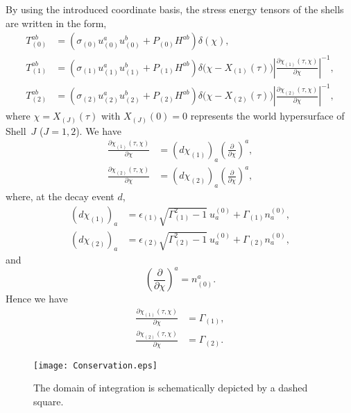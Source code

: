 \documentclass[aps,preprint,preprintnumber,nofootinbib,amsmath,amssymb,ascmac,bm,12pt]{revtex4}
\newcommand{\sz}{\sigma_{(0)}}
\newcommand{\so}{\sigma_{(1)}}
\newcommand{\st}{\sigma_{(2)}}
\newcommand{\Go}{\varGamma_{(1)}}
\newcommand{\Gt}{\varGamma_{(2)}}
\begin{document}
By using the introduced coordinate basis, the stress energy tensors of the shells are written in the form, 
\begin{align}
T_{(0)}^{ab}&=\left(\sz u_{(0)}^a u_{(0)}^b+P_{(0)}H^{ab}\right) \delta(\chi), \label{SE-0}\\
T_{(1)}^{ab}&=\left(\so u_{(1)}^a u_{(1)}^b+P_{(1)}H^{ab}\right) \delta\bigl(\chi-X_{(1)}(\tau)\bigr) 
\left|\frac{\partial \chi_{(1)}\left(\tau,\chi\right)}{\partial \chi}\right|^{-1}, \label{SE-1}\\
T_{(2)}^{ab}&=\left(\st u_{(2)}^a u_{(2)}^b+P_{(2)}H^{ab}\right) \delta\bigl(\chi-X_{(2)}(\tau)\bigr) 
\left|\frac{\partial \chi_{(2)}\left(\tau,\chi\right)}{\partial \chi}\right|^{-1}, \label{SE-2}
\end{align}
where %
$\chi=X_{(J)}(\tau)$ with $X_{(J)}(0)=0$ represents the world hypersurface of Shell~$J$ ($J=1,2$). 
We have
\begin{align}
\frac{\partial \chi_{(1)}\left(\tau,\chi\right)}{\partial \chi}
&=(d\chi_{(1)})_a\left(\frac{\partial}{\partial \chi}\right)^a, \label{del-1}\\
\frac{\partial \chi_{(2)}\left(\tau,\chi\right)}{\partial \chi}
&=\left(d\chi_{(2)}\right)_a\left(\frac{\partial}{\partial \chi}\right)^a, \label{del-2}
\end{align}
where, at the decay event $d$, 
\begin{align}
(d\chi_{(1)})_a&=\epsilon_{(1)}\sqrt{\Go^2-1}~u^{(0)}_a+\Go n^{(0)}_a, \nonumber \\
(d\chi_{(2)})_a&=\epsilon_{(2)}\sqrt{\Gt^2-1}~u^{(0)}_a+\Gt n^{(0)}_a, \nonumber
\end{align}
and 
$$
\left(\frac{\partial}{\partial\chi}\right)^a=n_{(0)}^a. 
$$
Hence we have
\begin{align}
\frac{\partial \chi_{(1)}\left(\tau,\chi\right)}{\partial \chi}
&=\Go, \\
\frac{\partial \chi_{(2)}\left(\tau,\chi\right)}{\partial \chi}
&=\Gt.  
\end{align}

\begin{figure}[htbp]
 \begin{center}
 \texttt{[image: Conservation.eps]}
 \end{center}
 \caption{
The domain of integration is schematically depicted by a dashed square.  }
 \label{Conservation}
\end{figure}
\end{document}
